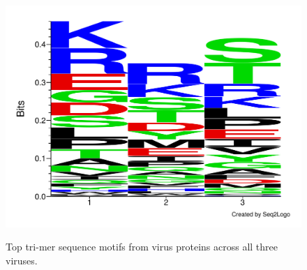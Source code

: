 \documentclass[runningheads,a4paper]{llncs}
\begin{document}
\begin{figure}
\begin{floatrow}
{\includegraphics[scale=0.2, trim = 0 0.8cm 0 0]{figures/fig4-eps-converted-to.pdf}
}{%
\caption{Top tri-mer sequence motifs from virus proteins across all three viruses.}%
\label{fig:virus_3mer_motifs}
}
\end{floatrow}
\end{figure}
\end{document}
